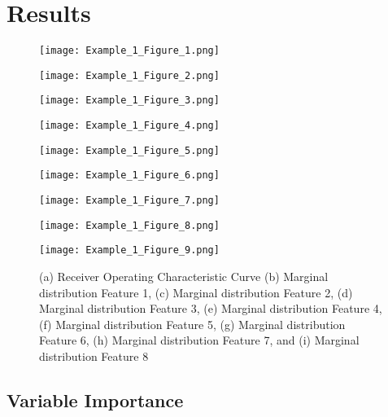 \section{Results}

\begin{figure}[H]
	\centering
	\begin{minipage}[b]{0.3\linewidth}
		\texttt{[image: Example\_1\_Figure\_1.png]}
	\end{minipage}\hfill
	\begin{minipage}[b]{0.3\linewidth}
		\texttt{[image: Example\_1\_Figure\_2.png]}
	\end{minipage}\hfill	
	\begin{minipage}[b]{0.3\linewidth}
		\texttt{[image: Example\_1\_Figure\_3.png]}
	\end{minipage}\hfill
	\begin{minipage}[b]{0.3\linewidth}
		\texttt{[image: Example\_1\_Figure\_4.png]}
	\end{minipage}\hfill
	\begin{minipage}[b]{0.3\linewidth}
		\texttt{[image: Example\_1\_Figure\_5.png]}
	\end{minipage}\hfill	
	\begin{minipage}[b]{0.3\linewidth}
		\texttt{[image: Example\_1\_Figure\_6.png]}
	\end{minipage}\hfill
	\begin{minipage}[b]{0.3\linewidth}
		\texttt{[image: Example\_1\_Figure\_7.png]}
	\end{minipage}\hfill
	\begin{minipage}[b]{0.3\linewidth}
		\texttt{[image: Example\_1\_Figure\_8.png]}
	\end{minipage}\hfill	
	\begin{minipage}[b]{0.3\linewidth}
		\texttt{[image: Example\_1\_Figure\_9.png]}
	\end{minipage}\hfill
	\caption{(a) Receiver Operating Characteristic Curve (b) Marginal distribution Feature 1, (c) Marginal distribution Feature 2, (d) Marginal distribution Feature 3, (e) Marginal distribution Feature 4,
(f) Marginal distribution Feature 5, (g) Marginal distribution Feature 6, (h) Marginal distribution Feature 7, and (i) Marginal distribution Feature 8}
	\label{fig:Figure1}
\end{figure} 

\subsection{Variable Importance}

